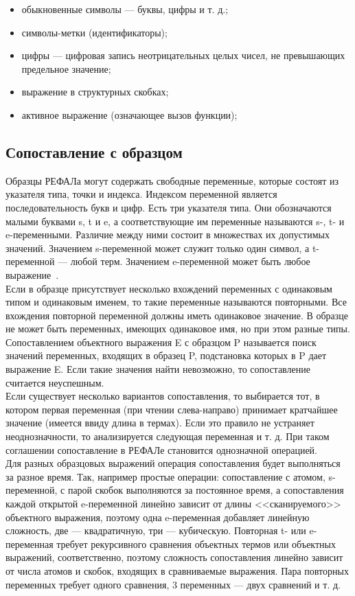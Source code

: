 \documentclass[12pt]{article}
\begin{document}
\begin{itemize}
\item обыкновенные символы --- буквы, цифры и т. д.;
\item символы-метки (идентификаторы);
\item цифры --- цифровая запись неотрицательных целых чисел, не превышающих предельное значение;
\item выражение в структурных скобках;
\item активное выражение (означающее вызов функции);
\end{itemize}

\subsection[Сопоставление с образцом]{\large Сопоставление с образцом}
\hspace{\parindent}Образцы РЕФАЛа могут содержать свободные переменные, которые состоят из указателя типа, точки и индекса. Индексом переменной является последовательность букв и цифр. Есть три указателя типа. Они обозначаются малыми буквами s, t и e, а соответствующие им переменные называются  s-, t- и e-переменными. Различие между ними состоит в множествах их допустимых значений.  Значением s-переменной может служит только один символ, а t-переменной --- любой терм. Значением e-переменной может быть любое выражение~\cite{RefalBasis}. \\
\indent Если в образце присутствует несколько вхождений переменных с одинаковым типом и одинаковым именем, то такие переменные называются повторными. Все вхождения повторной переменной должны иметь одинаковое значение. В образце не может быть переменных, имеющих одинаковое имя, но при этом разные типы.\\
\indent Сопоставлением объектного выражения E с образцом P называется поиск значений переменных, входящих в образец P, подстановка которых в P дает выражение E. Если такие значения найти невозможно, то сопоставление считается неуспешным. \\
\indent Если существует несколько вариантов сопоставления, то выбирается тот, в котором первая переменная (при чтении слева-направо) принимает кратчайшее значение (имеется ввиду длина в термах). Если это правило не устраняет неоднозначности, то анализируется следующая переменная и т. д. При таком соглашении сопоставление в РЕФАЛе становится однозначной операцией. \\
\indent Для разных образцовых выражений операция сопоставления будет выполняться за разное время. Так, например простые операции: сопоставление с атомом, s-переменной, с парой скобок выполняются за постоянное время, а сопоставления каждой открытой e-переменной линейно зависит от длины <<сканируемого>> объектного выражения, поэтому одна e-переменная добавляет линейную сложность, две — квадратичную, три — кубическую. Повторная t- или e-переменная требует рекурсивного сравнения объектных термов или объектных выражений, соответственно, поэтому сложность сопоставления линейно зависит от числа атомов и скобок, входящих в сравниваемые выражения. Пара повторных переменных требует одного сравнения, 3 переменных — двух сравнений и т. д.
\end{document}
